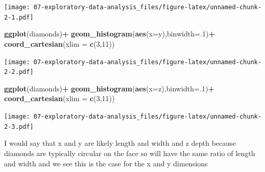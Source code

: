 \documentclass[]{book}
\newenvironment{Shaded}{\begin{snugshade}}{\end{snugshade}}
\newcommand{\DataTypeTok}[1]{\textcolor[rgb]{0.13,0.29,0.53}{#1}}
\newcommand{\DecValTok}[1]{\textcolor[rgb]{0.00,0.00,0.81}{#1}}
\newcommand{\KeywordTok}[1]{\textcolor[rgb]{0.13,0.29,0.53}{\textbf{#1}}}
\newcommand{\NormalTok}[1]{#1}
\newcommand{\OperatorTok}[1]{\textcolor[rgb]{0.81,0.36,0.00}{\textbf{#1}}}
\newcommand{\StringTok}[1]{\textcolor[rgb]{0.31,0.60,0.02}{#1}}
\theoremstyle{definition}
\theoremstyle{definition}
\theoremstyle{definition}
\theoremstyle{remark}
\begin{document}
\texttt{[image: 07-exploratory-data-analysis\_files/figure-latex/unnamed-chunk-2-1.pdf]}

\begin{Shaded}
\begin{Highlighting}[]
\KeywordTok{ggplot}\NormalTok{(diamonds)}\OperatorTok{+}
\StringTok{  }\KeywordTok{geom_histogram}\NormalTok{(}\KeywordTok{aes}\NormalTok{(}\DataTypeTok{x=}\NormalTok{y),}\DataTypeTok{binwidth=}\NormalTok{.}\DecValTok{1}\NormalTok{)}\OperatorTok{+}
\StringTok{  }\KeywordTok{coord_cartesian}\NormalTok{(}\DataTypeTok{xlim =} \KeywordTok{c}\NormalTok{(}\DecValTok{3}\NormalTok{,}\DecValTok{11}\NormalTok{))}
\end{Highlighting}
\end{Shaded}

\texttt{[image: 07-exploratory-data-analysis\_files/figure-latex/unnamed-chunk-2-2.pdf]}

\begin{Shaded}
\begin{Highlighting}[]
\KeywordTok{ggplot}\NormalTok{(diamonds)}\OperatorTok{+}
\StringTok{  }\KeywordTok{geom_histogram}\NormalTok{(}\KeywordTok{aes}\NormalTok{(}\DataTypeTok{x=}\NormalTok{z),}\DataTypeTok{binwidth=}\NormalTok{.}\DecValTok{1}\NormalTok{)}\OperatorTok{+}
\StringTok{  }\KeywordTok{coord_cartesian}\NormalTok{(}\DataTypeTok{xlim =} \KeywordTok{c}\NormalTok{(}\DecValTok{3}\NormalTok{,}\DecValTok{11}\NormalTok{))}
\end{Highlighting}
\end{Shaded}

\texttt{[image: 07-exploratory-data-analysis\_files/figure-latex/unnamed-chunk-2-3.pdf]}

I would say that x and y are likely length and width and z depth because
diamonds are typically circular on the face so will have the same ratio
of length and width and we see this is the case for the x and y
dimensions

\begin{Shaded}
\end{Shaded}
\end{document}
